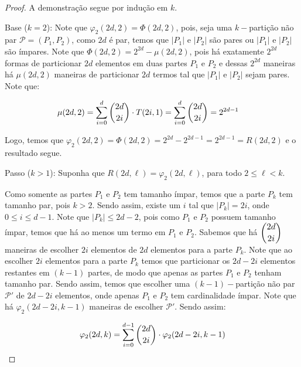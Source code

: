 \documentclass[12pt]{article}
\begin{document}
  \begin{proof}
  	A demonstração segue por indução em $k$.
  	
  	Base ($k = 2$): Note que $\varphi_2(2d, 2) = \Phi(2d, 2)$, pois, seja uma $k-$partição não par $\mathcal{P}=(P_1, P_2)$, como $2d$ é par, temos que $|P_1| \text{ e } |P_2|$ são pares ou $|P_1| \text{ e } |P_2|$ são ímpares. Note que $\Phi(2d, 2) = 2^{2d} - \mu(2d, 2)$, pois há exatamente $2^{2d}$ formas de particionar $2d$ elementos em duas partes $P_1$ e $P_2$ e dessas $2^{2d}$ maneiras há $\mu(2d, 2)$ maneiras de particionar $2d$ termos tal que $|P_1|$ e $|P_2|$ sejam pares. Note que:  
  	
  	\begin{align}
  		\begin{split}
  			\mu(2d, 2) &= \sum\limits_{i = 0}^{d}\escolhe{2d}{2i} \cdot T(2i, 1) = \sum\limits_{i = 0}^{d}\escolhe{2d}{2i} = 2^{2d-1}
  		\end{split} 
  	\end{align} 
  	
  	Logo, temos que $\varphi_2(2d, 2) = \Phi(2d, 2) = 2^{2d} - 2^{2d - 1} = 2^{2d - 1} = R(2d, 2)$ e o resultado segue. \newl
  	
  	
  	Passo ($k > 1$): Suponha que $R(2d, \ell) = \varphi_2(2d, \ell)$, para todo $2 \leq \ell < k$.
  	 
  	
  	 Como somente as partes $P_1$ e $P_2$ tem tamanho ímpar, temos que a parte $P_k$ tem tamanho par, pois $k > 2$. Sendo assim, existe um $i$ tal que $|P_k| = 2i$, onde $0 \leq i \leq d - 1$. Note que $|P_k| \leq 2d - 2$, pois como $P_1$ e $P_2$ possuem tamanho ímpar, temos que há ao menos um termo em $P_1$ e $P_2$. Sabemos que há $\escolhe{2d}{2i}$ maneiras de escolher $2i$ elementos de $2d$ elementos para a parte $P_k$. Note que ao escolher $2i$ elementos para a parte $P_k$ temos que particionar os $2d - 2i$ elementos restantes em $(k-1)$ partes, de modo que apenas as partes $P_1$ e $P_2$ tenham tamanho par. Sendo assim, temos que escolher uma $(k-1)-$partição não par $\mathcal{P'}$ de $2d - 2i$ elementos, onde apenas $P_1$ e $P_2$ tem cardinalidade ímpar. Note que há $\varphi_2(2d - 2i, k-1)$ maneiras de escolher $\mathcal{P'}$. Sendo assim: 
  	  
  	
  	\begin{align}
  		\begin{split}
  			\varphi_2(2d, k) = \sum\limits_{i = 0}^{d - 1}\escolhe{2d}{2i} \cdot \varphi_2(2d - 2i, k-1)
  		\end{split} 
  	\end{align} 
  	

\end{proof}
\end{document}
